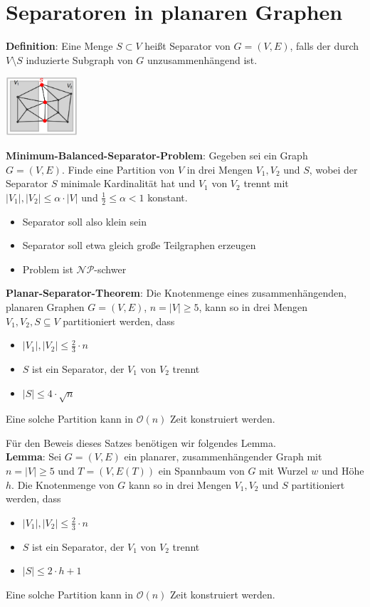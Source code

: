 \section{Separatoren in planaren Graphen}

\textbf{Definition}: Eine Menge $S\subset V$ heißt Separator von $G = (V, E)$, falls der durch $V\setminus S$ induzierte Subgraph von $G$ unzusammenhängend ist.

\begin{center}
	\includegraphics[width=0.2\textwidth]{images/separator.png}
\end{center}
\bigskip
\textbf{Minimum-Balanced-Separator-Problem}: Gegeben sei ein Graph $G = (V, E)$. Finde eine Partition von $V$ in drei Mengen $V_1, V_2$ und $S$, wobei der Separator $S$ minimale Kardinalität hat und $V_1$ von $V_2$ trennt mit $|V_1|,|V_2|\leq\alpha\cdot|V|$ und $\frac{1}{2}\leq\alpha<1$ konstant.
\begin{itemize}
	\item Separator soll also klein sein
	\item Separator soll etwa gleich große Teilgraphen erzeugen
	\item Problem ist $\mathcal{NP}$-schwer
\end{itemize}
\bigskip
\textbf{Planar-Separator-Theorem}: Die Knotenmenge eines zusammenhängenden, planaren Graphen $G = (V, E)$, $n = |V| \geq 5$, kann so in drei Mengen $V_1, V_2, S\subseteq V$ partitioniert werden, dass
\begin{itemize}
	\item $|V_1|,|V_2|\leq\frac{2}{3}\cdot n$
	\item $S$ ist ein Separator, der $V_1$ von $V_2$ trennt
	\item $|S| \leq 4\cdot\sqrt{n}$
\end{itemize}
Eine solche Partition kann in $\mathcal{O}(n)$ Zeit konstruiert werden.

Für den Beweis dieses Satzes benötigen wir folgendes Lemma.\\

\textbf{Lemma}: Sei $G = (V, E)$ ein planarer, zusammenhängender Graph mit $n = |V| \geq 5$ und $T=(V,E(T))$ ein Spannbaum von $G$ mit Wurzel $w$ und Höhe $h$. Die Knotenmenge von $G$ kann so in drei Mengen $V_1, V_2$ und $S$ partitioniert werden, dass
\begin{itemize}
	\item $|V_1|,|V_2|\leq\frac{2}{3}\cdot n$
	\item $S$ ist ein Separator, der $V_1$ von $V_2$ trennt
	\item $|S|\leq 2\cdot h+1$
\end{itemize}
Eine solche Partition kann in $\mathcal{O}(n)$ Zeit konstruiert werden.

